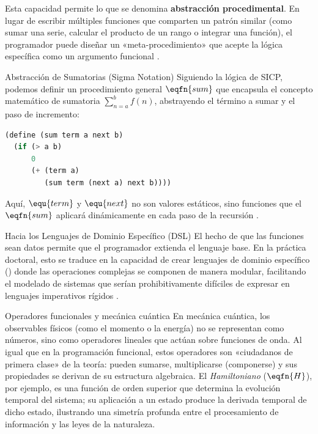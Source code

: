 Esta capacidad permite lo que se denomina \textbf{abstracción procedimental}. En lugar de escribir múltiples funciones que comparten un patrón similar (como sumar una serie, calcular el producto de un rango o integrar una función), el programador puede diseñar un «meta-procedimiento» que acepte la lógica específica como un argumento funcional \cite{SICP}.

\begin{ejemplo}{Abstracción de Sumatorias (Sigma Notation)}
Siguiendo la lógica de SICP, podemos definir un procedimiento general $\eqfn{sum}$ que encapsula el concepto matemático de sumatoria $\sum_{n=a}^b f(n)$, abstrayendo el término a sumar y el paso de incremento:
\begin{lstlisting}[language=Lisp, caption={Sumatoria como función de orden superior}]
(define (sum term a next b)
  (if (> a b)
      0
      (+ (term a)
         (sum term (next a) next b))))
\end{lstlisting}
Aquí, $\equ{term}$ y $\equ{next}$ no son valores estáticos, sino funciones que el $\eqfn{sum}$ aplicará dinámicamente en cada paso de la recursión \cite{SICP}.
\end{ejemplo}

\begin{observacion}{Hacia los Lenguajes de Dominio Específico (DSL)}
El hecho de que las funciones sean datos permite que el programador extienda el lenguaje base. En la práctica doctoral, esto se traduce en la capacidad de crear lenguajes de dominio específico () donde las operaciones complejas se componen de manera modular, facilitando el modelado de sistemas que serían prohibitivamente difíciles de expresar en lenguajes imperativos rígidos \cite{SICP, HtDP}.
\end{observacion}

\begin{fisicaconexion}{Operadores funcionales y mecánica cuántica}
En mecánica cuántica, los observables físicos (como el momento o la energía) no se representan como números, sino como operadores lineales que actúan sobre funciones de onda. Al igual que en la programación funcional, estos operadores son «ciudadanos de primera clase» de la teoría: pueden sumarse, multiplicarse (componerse) y sus propiedades se derivan de su estructura algebraica. El \textit{Hamiltoniano} ($\eqfn{H}$), por ejemplo, es una función de orden superior que determina la evolución temporal del sistema; su aplicación a un estado produce la derivada temporal de dicho estado, ilustrando una simetría profunda entre el procesamiento de información y las leyes de la naturaleza.
\end{fisicaconexion}

